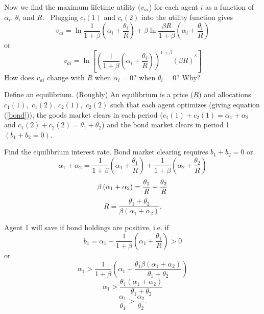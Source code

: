 \documentclass{sebase}
\begin{document}
\pagebreak

Now we find the maximum lifetime utility ($v_{ai}$) for each agent $i$ as a
function of $\alpha _{i}$, $\theta _{i}$ and $R$. \ Plugging $c_{i}\left(
1\right) $ and $c_{i}\left( 2\right) $ into the utility function gives%
\begin{equation*}
v_{ai}=\ln \frac{1}{1+\beta }\left( \alpha _{i}+\frac{\theta _{i}}{R}\right)
+\beta \ln \frac{\beta R}{1+\beta }\left( \alpha _{i}+\frac{\theta _{i}}{R}%
\right)
\end{equation*}%
or%
\begin{equation*}
v_{ai}=\ln \left[ \left( \frac{1}{1+\beta }\left( \alpha _{i}+\frac{\theta
_{i}}{R}\right) \right) ^{1+\beta }\left( \beta R\right) ^{^{\beta }}\right]
\end{equation*}%
How does $v_{ai}$ change with $R$ when $\alpha _{i}=0?$ when $\theta _{i}=0?$
Why?

\pagebreak

Define an equilibrium. \newline
(Roughly) An equilibrium is a price ($R$) and allocations $c_{1}\left(
1\right) ,$ $c_{1}\left( 2\right) $, $c_{2}\left( 1\right) ,$ $c_{2}\left(
2\right) $ such that each agent optimizes (giving equation (\ref{bond})),
the goods market clears in each period ($c_{1}\left( 1\right) +c_{2}\left(
1\right) =\alpha _{1}+\alpha _{2}$ and $c_{1}\left( 2\right) +c_{2}\left(
2\right) =\theta _{1}+\theta _{2}$) and the bond market clears in period 1 $%
\left( b_{1}+b_{2}=0\right) .$

Find the equilibrium interest rate. Bond market clearing requires $%
b_{1}+b_{2}=0$ or 
\begin{equation*}
\alpha _{1}+\alpha _{2}=\frac{1}{1+\beta }\left( \alpha _{1}+\frac{\theta
_{1}}{R}\right) +\frac{1}{1+\beta }\left( \alpha _{2}+\frac{\theta _{2}}{R}%
\right)
\end{equation*}%
\begin{equation*}
\beta \left( \alpha _{1}+\alpha _{2}\right) =\frac{\theta _{1}}{R}+\frac{%
\theta _{2}}{R}
\end{equation*}%
\begin{equation*}
R=\frac{\theta _{1}+\theta _{2}}{\beta \left( \alpha _{1}+\alpha _{2}\right) 
}.
\end{equation*}

\pagebreak

Agent 1 will save if bond holdings are positive, i.e. if 
\begin{equation*}
b_{1}=\alpha _{1}-\frac{1}{1+\beta }\left( \alpha _{1}+\frac{\theta _{1}}{R}%
\right) >0
\end{equation*}%
or%
\begin{equation*}
\alpha _{1}>\frac{1}{1+\beta }\left( \alpha _{1}+\frac{\theta _{1}\beta
\left( \alpha _{1}+\alpha _{2}\right) }{\theta _{1}+\theta _{2}}\right)
\end{equation*}%
\begin{equation*}
\alpha _{1}>\frac{\theta _{1}\left( \alpha _{1}+\alpha _{2}\right) }{\theta
_{1}+\theta _{2}}
\end{equation*}%
\begin{equation*}
\frac{\alpha _{1}}{\theta _{1}}>\frac{\alpha _{2}}{\theta _{2}}.
\end{equation*}
\end{document}
